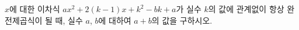 $x$에 대한 이차식 $ax^2+2(k-1)x+k^2-bk+a$가 실수 $k$의 값에 관계없이 항상 완전제곱식이 될 때, 실수 $a$, $b$에 대하여 $a+b$의 값을 구하시오.
